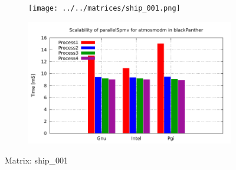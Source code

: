 \begin{figure} [ht!]
    \centering
    \captionsetup{justification=centering, singlelinecheck=false}
    \begin{subfigure}{.65\textwidth}
      \centering
      \hspace*{-3.5cm} 
      \texttt{[image: ../../matrices/ship\_001.png]}
      \label{fig:ship_001_matrix}
    \end{subfigure}%
    \begin{subfigure}{.65\textwidth}
      \centering
      \hspace*{-6.0cm} 
      \includegraphics[page=6, width=0.95\linewidth]{../plots/blackPanther.pdf}
      \label{fig:ship_001_performance}
    \end{subfigure}
\caption{Matrix: ship\_001}
\label{fig:ship_001}
\end{figure}


